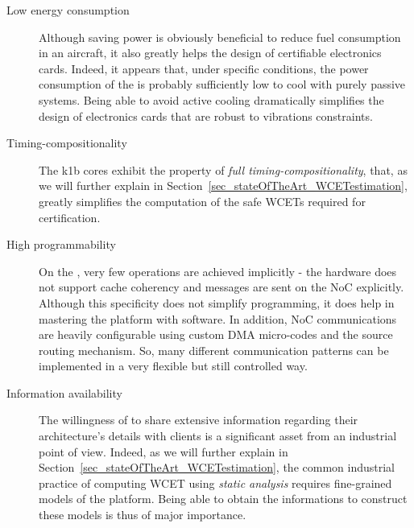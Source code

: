 \documentclass[main.tex]{subfiles}
\begin{document}
\begin{description}
    \item[Low energy consumption]
    Although saving power is obviously beneficial to reduce fuel consumption in an aircraft, it also greatly helps the design of certifiable electronics cards. Indeed, it appears that, under specific conditions, the power consumption of the \mppalong is probably sufficiently low to cool with purely passive systems. Being able to avoid active cooling dramatically simplifies the design of electronics cards that are robust to vibrations constraints.

    \item[Timing-compositionality]
    The k1b cores exhibit the property of \emph{full timing-compositionality}, that, as we will further explain in Section~\ref{sec_stateOfTheArt_WCETestimation}, greatly simplifies the computation of the safe WCETs required for certification.

    \item[High programmability]
    On the \mppalong, very few operations are achieved implicitly - the hardware does not support cache coherency and messages are sent on the NoC explicitly. Although this specificity does not simplify programming, it does help in mastering the platform with software. In addition, NoC communications are heavily configurable using custom DMA micro-codes and the source routing mechanism. So, many different communication patterns can be implemented in a very flexible but still controlled way.

    \item[Information availability]
    The willingness of \kalray to share extensive information regarding their architecture's details with clients is a significant asset from an industrial point of view. Indeed, as we will further explain in Section~\ref{sec_stateOfTheArt_WCETestimation}, the common industrial practice of computing WCET using \emph{static analysis} requires fine-grained models of the platform. Being able to obtain the informations to construct these models is thus of major importance.
\end{description}
\end{document}
